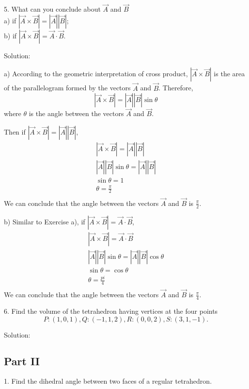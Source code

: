 \documentclass{article}
\begin{document}
5. What can you conclude about $\vec{A}$ and $\vec{B}$\\
a) if $|\vec{A} \times \vec{B}| = |\vec{A}| |\vec{B}|$;\\
b) if $|\vec{A} \times \vec{B}| = \vec{A} \cdot \vec{B}$.

Solution:

a) According to the geometric interpretation of cross product, 
$|\vec{A} \times \vec{B}|$ is the area of the parallelogram formed by the 
vectors $\vec{A}$ and $\vec{B}$. Therefore,
\[
  |\vec{A} \times \vec{B}| = |\vec{A}| |\vec{B}| \sin\theta
\]
where $\theta$ is the angle between the vectors $\vec{A}$ and $\vec{B}$.

Then if $|\vec{A} \times \vec{B}| = |\vec{A}| |\vec{B}|$,
\begin{gather*}
  |\vec{A} \times \vec{B}| = |\vec{A}| |\vec{B}| \\
  |\vec{A}| |\vec{B}| \sin\theta = |\vec{A}| |\vec{B}| \\
  \sin\theta = 1 \\
  \theta = \frac{\pi}{2} \\
\end{gather*}
We can conclude that the angle between the vectors $\vec{A}$ and $\vec{B}$ is 
$\frac{\pi}{2}$.

b) Similar to Exercise a), if 
$|\vec{A} \times \vec{B}| = \vec{A} \cdot \vec{B}$,
\begin{gather*}
  |\vec{A} \times \vec{B}| = \vec{A} \cdot \vec{B} \\
  |\vec{A}| |\vec{B}| \sin\theta = |\vec{A}| |\vec{B}| \cos\theta \\
  \sin\theta = \cos\theta \\
  \theta = \frac{pi}{4} \\
\end{gather*}
We can conclude that the angle between the vectors $\vec{A}$ and $\vec{B}$ is 
$\frac{\pi}{4}$.

6. Find the volume of the tetrahedron having vertices at the four points
\[ P:(1,0,1), Q:(-1,1,2), R:(0,0,2), S:(3,1,-1).\]

Solution:



\begin{center}
\section*{Part II}
\end{center}

1. Find the dihedral angle between two faces of a regular tetrahedron.
\end{document}

